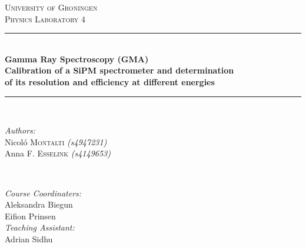 \documentclass[a4paper, 11pt, table]{article}
\begin{document}
\begin{titlepage}

    \newcommand{\HRule}{\rule{\textwidth}{0.5mm}} %

    \center %


    \textsc{\LARGE University of Groningen}\\[1.5cm] %
    \textsc{\Large Physics Laboratory 4}\\[0.5cm] %


    \HRule \\[0.4cm]
    { \huge \bfseries Gamma Ray Spectroscopy (GMA)}\\[0.3cm] %
    { \Large \bfseries Calibration of a SiPM spectrometer and determination \\of its resolution and efficiency at different energies}\\[0.3cm] %
    \HRule \\[1.5cm]


    \begin{minipage}{0.4\textwidth}
        \begin{flushleft} \large
            \emph{Authors:}\\
            Nicol\'{o} \textsc{Montalti} \textit{(s4947231)} \\
            Anna F. \textsc{Esselink} \textit{(s4149653)} \\
        \end{flushleft}
    \end{minipage}
    ~
    \begin{minipage}{0.4\textwidth}
        \begin{flushright} \large
            \emph{Course Coordinaters:} \\
            Aleksandra Biegun\\
            Eifion Prinsen\\
            \emph{Teaching Assistant:}\\
            Adrian Sidhu
            \hfill \\
        \end{flushright}
    \end{minipage}\\[1cm]


\end{titlepage}
\end{document}
